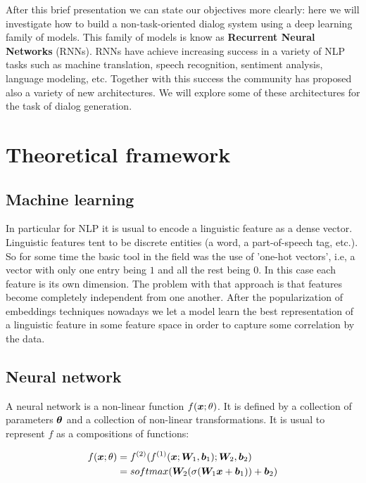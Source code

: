 \par After this brief presentation we can state our objectives more clearly: here we will investigate how to build a non-task-oriented dialog system using a deep learning family of models. This family of models is know as \textbf{Recurrent Neural Networks} (RNNs). RNNs have achieve increasing success in a variety of NLP tasks such as machine translation, speech recognition, sentiment analysis, language modeling, etc. Together with this success the community has proposed also a variety of new architectures. We will explore some of these architectures for the task of dialog generation.




\section{Theoretical framework}

\subsection{Machine learning}


In particular for NLP it is usual to encode a linguistic feature as a dense vector. Linguistic features tent to be discrete entities (a word, a part-of-speech tag, etc.). So for some time the basic tool in the field was the use of 'one-hot vectors', i.e, a vector with only one entry being $1$ and all the rest being $0$. In this case each feature is its own dimension. The problem with that approach is that features become completely independent from one another. After the popularization of embeddings techniques \cite{Mikolov23} nowadays we let a model learn the best representation of a linguistic feature in some feature space in order to capture some correlation by the data.


\subsection{Neural network}


A neural network is a non-linear function $f(\bm{x}; \theta)$. It is defined by a collection of parameters $\bm{\theta}$ and a collection of non-linear transformations. It is usual to represent $f$ as a compositions of functions:

\begin{align}
f(\bm{x}; \theta) &= f^{(2)}(f^{(1)}(\bm{x}; \bm{W}_1, \bm{b}_1); \bm{W}_2, \bm{b}_2)\\
&= softmax(\bm{W}_2 (\sigma(\bm{W}_1\bm{x} + \bm{b}_1)) + \bm{b}_2)
\end{align}


